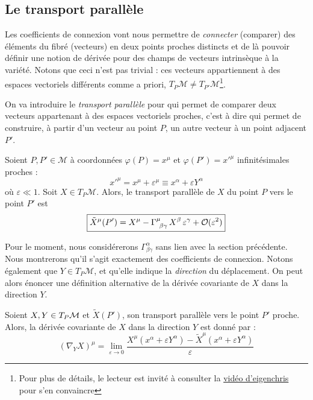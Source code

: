 \subsection{Le transport parallèle}

Les coefficients de connexion vont nous permettre de \emph{connecter} (comparer) des éléments du fibré (vecteurs) en deux points proches distincts et de là pouvoir définir une notion de dérivée pour des champs de vecteurs intrinsèque à la variété. Notons que ceci n'est pas trivial : ces vecteurs appartiennent à des espaces vectoriels différents comme a priori, $T_P\mathcal{M} \neq T_{P'}\mathcal{M}$\footnote{Pour plus de détails, le lecteur est invité à consulter la \href{https://youtu.be/Af9JUiQtV1k?si=gT3A0wMGmJmEb9g0}{vidéo d'eigenchris} pour s'en convaincre}. 

On va introduire le \textit{transport parallèle} pour qui permet de comparer deux vecteurs appartenant à des espaces vectoriels proches, c'est à dire qui permet de construire, à partir d'un vecteur au point $P$, un autre vecteur à un point adjacent $P'$.
\begin{theoremframe}
    \begin{defi}
        Soient $P, P' \in \mathcal{M}$ à coordonnées $\varphi(P) = x^\mu$ et $\varphi (P') = x'^\mu$ infinitésimales proches :
        \begin{equation}
            x'^\mu = x^\mu + \varepsilon^\mu \equiv x^{\alpha} + \varepsilon Y^{\alpha} 
        \end{equation}
        où $\varepsilon \ll 1$. Soit $X \in T_P\mathcal{M}$. Alors, le transport parallèle de $X$ du point $P$ vers le point $P'$ est
        \begin{equation}
            \boxed{\tilde{X}^{\mu}({P'}) = X^{\mu} - \Gamma\indices{^{\mu}_{\!\beta \gamma}}\,X^{\beta} \, \varepsilon^{\gamma} + \mathcal{O}(\varepsilon^2)}
        \end{equation}
    \end{defi}
\end{theoremframe}
Pour le moment, nous considérerons $\Gamma^{\alpha}_{\!\beta \gamma}$ sans lien avec la section précédente. Nous montrerons qu'il s'agit exactement des coefficients de connexion. Notons également que $Y\in T_P\mathcal{M}$, et qu'elle indique la \emph{direction} du déplacement.
On peut alors énoncer une définition alternative de la dérivée covariante de $X$ dans la direction $Y$.
\begin{theoremframe}
\begin{propri}
\label{def2:transport parallèle}
    Soient $X,Y \in T_P\mathcal{M}$ et $\tilde X (P')$, son transport parallèle vers le point $P'$ proche. Alors, la dérivée covariante de $X$ dans la direction $Y$ est donné par :
    \begin{equation}
        (\nabla_{Y}X)^{\mu} = \lim_{\varepsilon \rightarrow 0}\frac{X^{\mu}(x^{\alpha} + \varepsilon Y^{\alpha} ) - \tilde{X}^{\mu}(x^{\alpha} +\varepsilon Y^{\alpha} )}{\varepsilon}
    \end{equation}
\end{propri}
\end{theoremframe}

